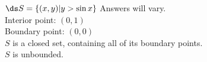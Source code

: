 {$\ds S=\{ (x,y) | y>\sin x\}$}
{Answers will vary.\\
Interior point: $(0,1)$\\
Boundary point: $(0,0)$\\
$S$ is a closed set, containing all of its boundary points.\\
$S$ is unbounded.
}